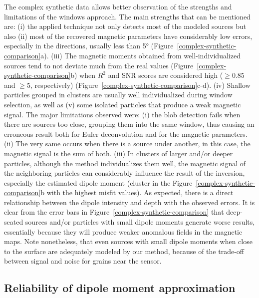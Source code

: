 The complex synthetic data allows better observation of the strengths and limitations of the windows approach.
The main strengths that can be mentioned are: (i) the applied technique not only detects most of the modeled sources but also (ii) most of the recovered magnetic parameters have considerably low errors, especially in the directions, usually less than 5° (Figure~\ref{complex-synthetic-comparison}a).
(iii) The magnetic moments obtained from well-individualized sources tend to not deviate much from the real values (Figure~\ref{complex-synthetic-comparison}b) when $R^2$ and SNR scores are considered high ($\geq 0.85$ and $\geq 5$, respectively) (Figure~\ref{complex-synthetic-comparison}c-d).
(iv) Shallow particles grouped in clusters are usually well individualized during window selection, as well as (v) some isolated particles that produce a weak magnetic signal.
The major limitations observed were: (i) the blob detection fails when there are sources too close, grouping them into the same window, thus causing an erroneous result both for Euler deconvolution and for the magnetic parameters.
(ii) The very same occurs when there is a source under another, in this case, the magnetic signal is the sum of both.
(iii) In clusters of larger and/or deeper particles, although the method individualizes them well, the magnetic signal of the neighboring particles can considerably influence the result of the inversion, especially the estimated dipole moment (cluster in the Figure~\ref{complex-synthetic-comparison}b with the highest misfit values).
As expected, there is a direct relationship between the dipole intensity and depth with the observed errors.
It is clear from the error bars in Figure~\ref{complex-synthetic-comparison} that deep-seated sources and/or particles with small dipole moments generate worse results, essentially because they will produce weaker anomalous fields in the magnetic maps.
Note nonetheless, that even sources with small dipole moments when close to the surface are adequately modeled by our method, because of the trade-off between signal and noise for grains near the sensor.


\subsection{Reliability of dipole moment approximation}
\label{dipole-reliability}

